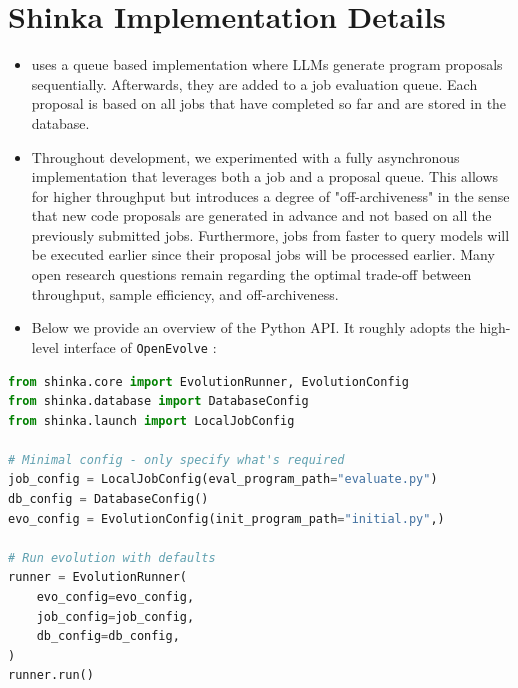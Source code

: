 \section{Shinka Implementation Details}
\label{appsec:shinka_code}

\begin{itemize}
  \item \ouralgo uses a queue based implementation where LLMs generate program proposals sequentially. Afterwards, they are added to a job evaluation queue. Each proposal is based on all jobs that have completed so far and are stored in the database.
  \item Throughout development, we experimented with a fully asynchronous implementation that leverages both a job and a proposal queue. This allows for higher throughput but introduces a degree of "off-archiveness" in the sense that new code proposals are generated in advance and not based on all the previously submitted jobs. Furthermore, jobs from faster to query models will be executed earlier since their proposal jobs will be processed earlier. Many open research questions remain regarding the optimal trade-off between throughput, sample efficiency, and off-archiveness.
  \item Below we provide an overview of the Python API. It roughly adopts the high-level interface of \texttt{OpenEvolve} \citep{openevolve}:
\end{itemize}

\begin{minipage}{\textwidth}
\begin{lstlisting}[language=Python, basicstyle=\ttfamily\tiny, caption={Minimal \ouralgo configuration and usage example.}, label={lst:shinka_usage}]
from shinka.core import EvolutionRunner, EvolutionConfig
from shinka.database import DatabaseConfig
from shinka.launch import LocalJobConfig

# Minimal config - only specify what's required
job_config = LocalJobConfig(eval_program_path="evaluate.py")
db_config = DatabaseConfig()
evo_config = EvolutionConfig(init_program_path="initial.py",)

# Run evolution with defaults
runner = EvolutionRunner(
    evo_config=evo_config,
    job_config=job_config,
    db_config=db_config,
)
runner.run()
\end{lstlisting}
\end{minipage}

\vspace{0.5em}

